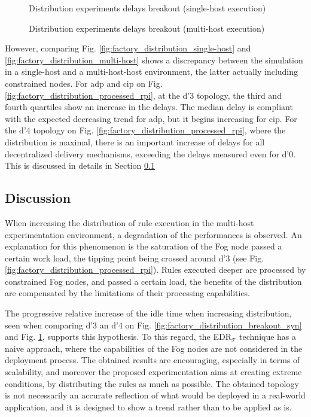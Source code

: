 \documentclass{iosart2c}
\newcommand{\edrt}{EDR$_{\mathcal{T}}$\xspace}
\begin{document}
\begin{figure}
	\Centering
	\caption{Distribution experiments delays breakout (single-host execution)}
	\label{fig:factory_distribution_breakout_syn}
	\scalebox{0.78}{
		
	}
	\caption{Distribution experiments delays breakout (multi-host execution)}
	\label{fig:factory_distribution_breakout_rpi}
	\scalebox{0.78}{
		
	}
\end{figure}

However, comparing Fig. \ref{fig:factory_distribution_single-host} and \ref{fig:factory_distribution_multi-host} shows a discrepancy between the simulation in a single-host and a multi-host-host environment, the latter actually including constrained nodes.
For \gls{adp} and \gls{cip} on Fig. \ref{fig:factory_distribution_processed_rpi}, at the d'3 topology, the third and fourth quartiles show an increase in the delays.
The median delay is compliant with the expected decreasing trend for \gls{adp}, but it begins increasing for \gls{cip}.
For the d'4 topology on Fig. \ref{fig:factory_distribution_processed_rpi}, where the distribution is maximal, there is an important increase of delays for all decentralized delivery mechanisms, exceeding the delays measured even for d'0.
This is discussed in details in Section \textsection \ref{subs:discussion}

\subsection{Discussion}
\label{subs:discussion}

When increasing the distribution of rule execution in the multi-host experimentation environment, a degradation of the performances is observed.
An explanation for this phenomenon is the saturation of the Fog node passed a certain work load, the tipping point being crossed around d'3 (see Fig. \ref{fig:factory_distribution_processed_rpi}). 
Rules executed deeper are processed by constrained Fog nodes, and passed a certain load, the benefits of the distribution are compensated by the limitations of their processing capabilities.

The progressive relative increase of the idle time when increasing distribution, seen when comparing d'3 an d'4 on Fig. \ref{fig:factory_distribution_breakout_syn} and Fig. \ref{fig:factory_distribution_breakout_rpi}, supports this hypothesis.
To this regard, the \edrt technique has a naive approach, where the capabilities of the Fog nodes are not considered in the deployment process.
The obtained results are encouraging, especially in terms of scalability, and moreover the proposed experimentation aims at creating extreme conditions, by distributing the rules as much as possible.
The obtained topology is not necessarily an accurate reflection of what would be deployed in a real-world application, and it is designed to show a trend rather than to be applied as is.
\end{document}
